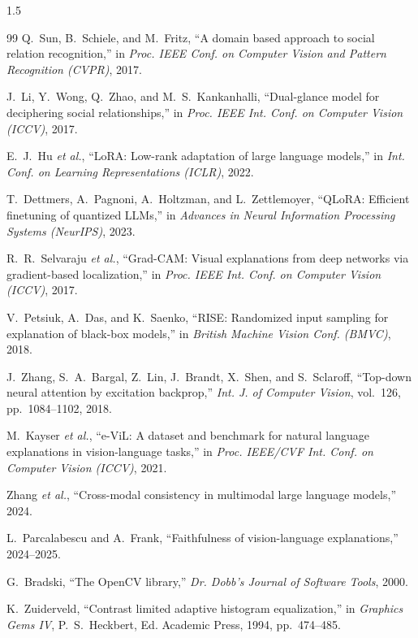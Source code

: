 \documentclass[a4paper, 14pt, oneside]{Thesis}
\begin{document}
{\begin{spacing}{1.5}
\begin{thebibliography}{99}
Q.~Sun, B.~Schiele, and M.~Fritz, ``A domain based approach to social relation recognition,'' in \textit{Proc. IEEE Conf. on Computer Vision and Pattern Recognition (CVPR)}, 2017.

J.~Li, Y.~Wong, Q.~Zhao, and M.~S.~Kankanhalli, ``Dual-glance model for deciphering social relationships,'' in \textit{Proc. IEEE Int. Conf. on Computer Vision (ICCV)}, 2017.

E.~J.~Hu \textit{et al.}, ``LoRA: Low-rank adaptation of large language models,'' in \textit{Int. Conf. on Learning Representations (ICLR)}, 2022.

T.~Dettmers, A.~Pagnoni, A.~Holtzman, and L.~Zettlemoyer, ``QLoRA: Efficient finetuning of quantized LLMs,'' in \textit{Advances in Neural Information Processing Systems (NeurIPS)}, 2023.

R.~R.~Selvaraju \textit{et al.}, ``Grad-CAM: Visual explanations from deep networks via gradient-based localization,'' in \textit{Proc. IEEE Int. Conf. on Computer Vision (ICCV)}, 2017.

V.~Petsiuk, A.~Das, and K.~Saenko, ``RISE: Randomized input sampling for explanation of black-box models,'' in \textit{British Machine Vision Conf. (BMVC)}, 2018.

J.~Zhang, S.~A.~Bargal, Z.~Lin, J.~Brandt, X.~Shen, and S.~Sclaroff, ``Top-down neural attention by excitation backprop,'' \textit{Int. J. of Computer Vision}, vol.~126, pp.~1084--1102, 2018.

M.~Kayser \textit{et al.}, ``e-ViL: A dataset and benchmark for natural language explanations in vision-language tasks,'' in \textit{Proc. IEEE/CVF Int. Conf. on Computer Vision (ICCV)}, 2021.

Zhang \textit{et al.}, ``Cross-modal consistency in multimodal large language models,'' 2024.

L.~Parcalabescu and A.~Frank, ``Faithfulness of vision-language explanations,'' 2024--2025.

G.~Bradski, ``The OpenCV library,'' \textit{Dr. Dobb's Journal of Software Tools}, 2000.

K.~Zuiderveld, ``Contrast limited adaptive histogram equalization,'' in \textit{Graphics Gems IV}, P.~S.~Heckbert, Ed. Academic Press, 1994, pp.~474--485.


\end{thebibliography}
\end{spacing}}
\end{document}
